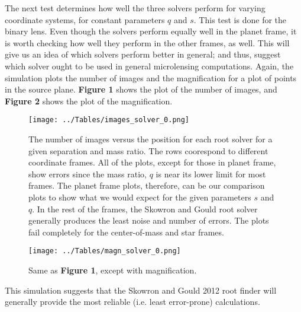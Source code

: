 \documentclass{article}
\begin{document}

The next test determines how well the three solvers perform for varying
coordinate systems, for constant parameters $q$ and $s$. This test is
done for the binary lens. Even though the solvers perform equally well
in the planet frame, it is worth checking how well they perform in the
other frames, as well. This will give us an idea of which solvers perform
better in general; and thus, suggest which solver ought to be used in
general microlensing computations. Again, the simulation plots the number
of images and the magnification for a plot of points in the source plane.
\textbf{Figure 1} shows the plot of the number of images, and
\textbf{Figure 2} shows the plot of the magnification.

\begin{figure}
	\texttt{[image: ../Tables/images\_solver\_0.png]}
	\caption{The number of images versus the position for each root solver
	for a given separation and mass ratio. The rows coorespond to different
	coordinate frames. All of the plots, except for those in planet frame,
	show errors since the mass ratio, $q$ is near its lower limit for most
	frames. The planet frame plots, therefore, can be our comparison plots
	to show what we would expect for the given parameters $s$ and $q$. In
	the rest of the frames, the Skowron and Gould root solver generally
	produces the least noise and number of errors. The plots fail completely
	for the center-of-mass and star frames.}
\end{figure}

\begin{figure}
	\texttt{[image: ../Tables/magn\_solver\_0.png]}
	\caption{Same as \textbf{Figure 1}, except with magnification.}
\end{figure}


This simulation suggests that the Skowron and Gould 2012 root finder will
generally provide the most reliable (i.e. least error-prone) calculations. 
\end{document}
